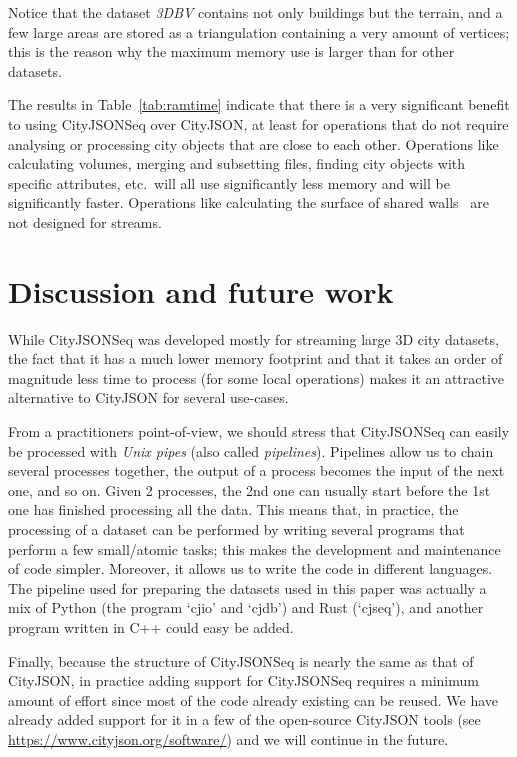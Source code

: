 \documentclass{isprs} %
\begin{document}
Notice that the dataset \emph{3DBV} contains not only buildings but the terrain, and a few large areas are stored as a triangulation containing a very amount of vertices; this is the reason why the maximum memory use is larger than for other datasets. 

%

The results in Table~\ref{tab:ramtime} indicate that there is a very significant benefit to using CityJSONSeq over CityJSON, at least for operations that do not require analysing or processing city objects that are close to each other.
Operations like calculating volumes, merging and subsetting files, finding city objects with specific attributes, etc.\ will all use significantly less memory and will be significantly faster.
Operations like calculating the surface of shared walls~\citep{Agugiaro22} are not designed for streams.

%
\section{Discussion and future work}%
\label{sec:discussion}



While CityJSONSeq was developed mostly for streaming large 3D city datasets, the fact that it has a much lower memory footprint and that it takes an order of magnitude less time to process (for some local operations) makes it an attractive alternative to CityJSON for several use-cases.

%

From a practitioners point-of-view, we should stress that CityJSONSeq can easily be processed with \emph{Unix pipes} (also called \emph{pipelines}).
Pipelines allow us to chain several processes together, the output of a process becomes the input of the next one, and so on. 
Given 2 processes, the 2nd one can usually start before the 1st one has finished processing all the data.
This means that, in practice, the processing of a dataset can be performed by writing several programs that perform a few small/atomic tasks; this makes the development and maintenance of code simpler.
Moreover, it allows us to write the code in different languages. 
The pipeline used for preparing the datasets used in this paper was actually a mix of Python (the program `cjio' and `cjdb') and Rust (`cjseq'), and another program written in C++ could easy be added.

%

Finally, because the structure of CityJSONSeq is nearly the same as that of CityJSON, in practice adding support for CityJSONSeq requires a minimum amount of effort since most of the code already existing can be reused. 
We have already added support for it in a few of the open-source CityJSON tools (see \url{https://www.cityjson.org/software/}) and we will continue in the future.


{
	\begin{spacing}{1.17}
		\normalsize
	\end{spacing}
}
\end{document}

